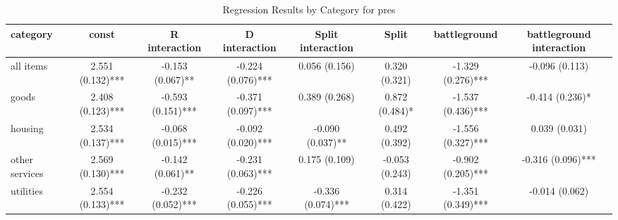 \begin{table}[H]
\caption{Regression Results by Category for pres}
\label{tab:regression_results}
\begin{tabular}{lccccccc}
\toprule
category & const & R interaction & D interaction & Split interaction & Split & battleground & battleground interaction \\
\midrule
all items & 2.551 (0.132)*** & -0.153 (0.067)** & -0.224 (0.076)*** & 0.056 (0.156) & 0.320 (0.321) & -1.329 (0.276)*** & -0.096 (0.113) \\
goods & 2.408 (0.123)*** & -0.593 (0.151)*** & -0.371 (0.097)*** & 0.389 (0.268) & 0.872 (0.484)* & -1.537 (0.436)*** & -0.414 (0.236)* \\
housing & 2.534 (0.137)*** & -0.068 (0.015)*** & -0.092 (0.020)*** & -0.090 (0.037)** & 0.492 (0.392) & -1.556 (0.327)*** & 0.039 (0.031) \\
other services & 2.569 (0.130)*** & -0.142 (0.061)** & -0.231 (0.063)*** & 0.175 (0.109) & -0.053 (0.243) & -0.902 (0.205)*** & -0.316 (0.096)*** \\
utilities & 2.554 (0.133)*** & -0.232 (0.052)*** & -0.226 (0.055)*** & -0.336 (0.074)*** & 0.314 (0.422) & -1.351 (0.349)*** & -0.014 (0.062) \\
\bottomrule
\end{tabular}
\end{table}
